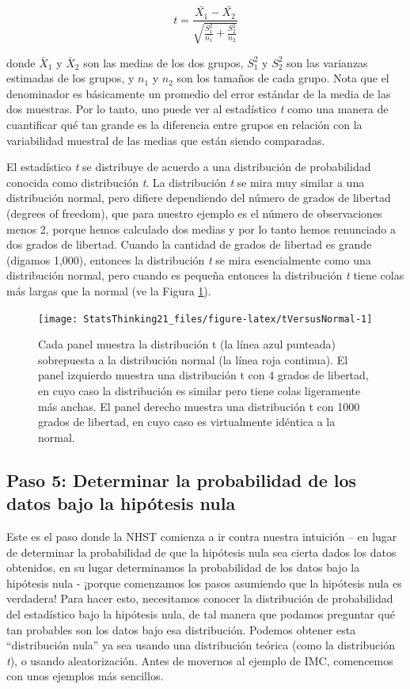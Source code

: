 \documentclass[
  12pt,
]{book}
\begin{document}
\[
t = \frac{\bar{X_1} - \bar{X_2}}{\sqrt{\frac{S_1^2}{n_1} + \frac{S_2^2}{n_2}}}
\]

donde \(\bar{X}_1\) y \(\bar{X}_2\) son las medias de los dos grupos, \(S^2_1\) y \(S^2_2\) son las varianzas estimadas de los grupos, y \(n_1\) y \(n_2\) son los tamaños de cada grupo. Nota que el denominador es básicamente un promedio del error estándar de la media de las dos muestras. Por lo tanto, uno puede ver al estadístico \emph{t} como una manera de cuantificar qué tan grande es la diferencia entre grupos en relación con la variabilidad muestral de las medias que están siendo comparadas.

El estadístico \emph{t} se distribuye de acuerdo a una distribución de probabilidad conocida como distribución \emph{t}. La distribución \emph{t} se mira muy similar a una distribución normal, pero difiere dependiendo del número de grados de libertad (degrees of freedom), que para nuestro ejemplo es el número de observaciones menos 2, porque hemos calculado dos medias y por lo tanto hemos renunciado a dos grados de libertad. Cuando la cantidad de grados de libertad es grande (digamos 1,000), entonces la distribución \emph{t} se mira esencialmente como una distribución normal, pero cuando es pequeña entonces la distribución \emph{t} tiene colas más largas que la normal (ve la Figura \ref{fig:tVersusNormal}).

\begin{figure}
\texttt{[image: StatsThinking21\_files/figure-latex/tVersusNormal-1]} \caption{Cada panel muestra la distribución t (la línea azul punteada) sobrepuesta a la distribución normal (la línea roja continua). El panel izquierdo muestra una distribución t con 4 grados de libertad, en cuyo caso la distribución es similar pero tiene colas ligeramente más anchas. El panel derecho muestra una distribución t con 1000 grados de libertad, en cuyo caso es virtualmente idéntica a la normal.}\label{fig:tVersusNormal}
\end{figure}

\hypertarget{paso-5-determinar-la-probabilidad-de-los-datos-bajo-la-hipuxf3tesis-nula}{%
\subsection{Paso 5: Determinar la probabilidad de los datos bajo la hipótesis nula}\label{paso-5-determinar-la-probabilidad-de-los-datos-bajo-la-hipuxf3tesis-nula}}

Este es el paso donde la NHST comienza a ir contra nuestra intuición -- en lugar de determinar la probabilidad de que la hipótesis nula sea cierta dados los datos obtenidos, en su lugar determinamos la probabilidad de los datos bajo la hipótesis nula - ¡porque comenzamos los pasos asumiendo que la hipótesis nula es verdadera! Para hacer esto, necesitamos conocer la distribución de probabilidad del estadístico bajo la hipótesis nula, de tal manera que podamos preguntar qué tan probables son los datos bajo esa distribución. Podemos obtener esta ``distribución nula'' ya sea usando una distribución teórica (como la distribución \emph{t}), o usando aleatorización. Antes de movernos al ejemplo de IMC, comencemos con unos ejemplos más sencillos.
\end{document}
